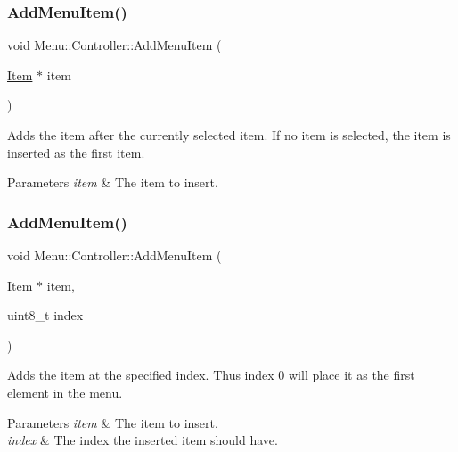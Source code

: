 \subsubsection{\texorpdfstring{Add\+Menu\+Item()}{AddMenuItem()}\hspace{0.1cm}{\footnotesize\ttfamily [1/2]}}
{\footnotesize\ttfamily void Menu\+::\+Controller\+::\+Add\+Menu\+Item (\begin{DoxyParamCaption}\item[{\hyperlink{struct_menu_1_1_item}{Item} $\ast$}]{item }\end{DoxyParamCaption})}

Adds the item after the currently selected item. If no item is selected, the item is inserted as the first item. 
\begin{DoxyParams}{Parameters}
{\em item} & The item to insert. \\
\hline
\end{DoxyParams}
\hypertarget{class_menu_1_1_controller_a9e5366f182975680e88749f03d249a0a}{}\label{class_menu_1_1_controller_a9e5366f182975680e88749f03d249a0a} 
\subsubsection{\texorpdfstring{Add\+Menu\+Item()}{AddMenuItem()}\hspace{0.1cm}{\footnotesize\ttfamily [2/2]}}
{\footnotesize\ttfamily void Menu\+::\+Controller\+::\+Add\+Menu\+Item (\begin{DoxyParamCaption}\item[{\hyperlink{struct_menu_1_1_item}{Item} $\ast$}]{item,  }\item[{uint8\+\_\+t}]{index }\end{DoxyParamCaption})}

Adds the item at the specified index. Thus index 0 will place it as the first element in the menu. 
\begin{DoxyParams}{Parameters}
{\em item} & The item to insert. \\
\hline
{\em index} & The index the inserted item should have. \\
\hline
\end{DoxyParams}
\hypertarget{class_menu_1_1_controller_ad28e732923bf111fd26a7ea031885f70}{}\label{class_menu_1_1_controller_ad28e732923bf111fd26a7ea031885f70} 
